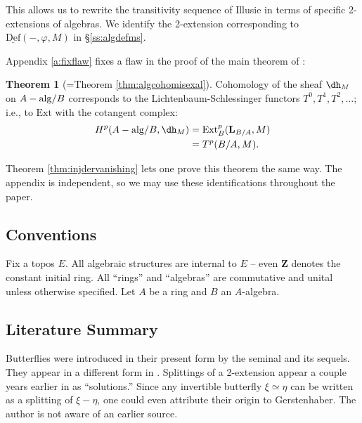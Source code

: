\documentclass[11pt,reqno]{amsart}
\theoremstyle{definition}
\newtheorem{theorem}{Theorem}[section]
\newcommand{\ZZ}{\mathbf{Z}}
\newcommand{\dd}[1]{\dh_{#1}}
\newcommand{\DDef}{\underline{\textrm{Def}}}
\newcommand{\Ext}{\textrm{Ext}}
\newcommand{\ccx}[1]{\mathbf{L}_{#1}}
\newcommand{\Aalg}{A-{\rm alg}}
\begin{document}
This allows us to rewrite the transitivity sequence of Illusie \cite[\S II.2.1]{illusie1} in terms of specific 2-extensions of algebras. We identify the 2-extension corresponding to $\DDef(-, \varphi, M)$ in \S \ref{ss:algdefms}. 


Appendix \ref{a:fixflaw} fixes a flaw in the proof of the main theorem of \cite{wisealgs1}:


\begin{theorem}[=Theorem \ref{thm:algcohomisexal}]\label{introthm:algcohomisexal}
Cohomology of the sheaf $\dd{M}$ on $\Aalg/B$ corresponds to the Lichtenbaum-Schlessinger functors $T^0, T^1, T^2, \dots$;
i.e., to $\Ext$ with the cotangent complex: 
\[
\begin{split}
H^p(\Aalg/B, \dd{M}) &= \Ext^p_B(\ccx{B/A}, M)  \\
    &=T^p(B/A, M).
\end{split}
\]
\end{theorem}

Theorem \ref{thm:injdervanishing} lets one prove this theorem the same way. The appendix is independent, so we may use these identifications throughout the paper. 






\subsection*{Conventions}

Fix a topos $E$. All algebraic structures are internal to $E$ -- even $\ZZ$ denotes the constant initial ring. All ``rings'' and ``algebras'' are commutative and unital unless otherwise specified. Let $A$ be a ring and $B$ an $A$-algebra. 




\subsection*{Literature Summary}


Butterflies were introduced in their present form by the seminal \cite{butterfliesoriginalnoohialdrovandi} and its sequels. They appear in a different form in \cite{SGA7-I}. Splittings of a 2-extension appear a couple years earlier in \cite{gerstenhaber2} as ``solutions.'' Since any invertible butterfly $\xi \simeq \eta$ can be written as a splitting of $\xi-\eta$, one could even attribute their origin to Gerstenhaber. The author is not aware of an earlier source. 
\end{document}
